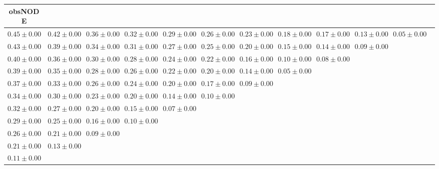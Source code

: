 \begin{table}[ht]
\centering
{\tiny
{
\begin{adjustbox}{width=\textwidth}
\begin{tabular}{cccccccccccc}
\hline
obsNODE &  &  &  &  &  &  &  &  &  & \\
\hline
$0.45 \pm 0.00$ & $0.42 \pm 0.00$ & $0.36 \pm 0.00$ & $0.32 \pm 0.00$ & $0.29 \pm 0.00$ & $0.26 \pm 0.00$ & $0.23 \pm 0.00$ & $0.18 \pm 0.00$ & $0.17 \pm 0.00$ & $0.13 \pm 0.00$ & $0.05 \pm 0.00$ &  \\
$0.43 \pm 0.00$ & $0.39 \pm 0.00$ & $0.34 \pm 0.00$ & $0.31 \pm 0.00$ & $0.27 \pm 0.00$ & $0.25 \pm 0.00$ & $0.20 \pm 0.00$ & $0.15 \pm 0.00$ & $0.14 \pm 0.00$ & $0.09 \pm 0.00$ &  &  \\
$0.40 \pm 0.00$ & $0.36 \pm 0.00$ & $0.30 \pm 0.00$ & $0.28 \pm 0.00$ & $0.24 \pm 0.00$ & $0.22 \pm 0.00$ & $0.16 \pm 0.00$ & $0.10 \pm 0.00$ & $0.08 \pm 0.00$ &  &  &  \\
$0.39 \pm 0.00$ & $0.35 \pm 0.00$ & $0.28 \pm 0.00$ & $0.26 \pm 0.00$ & $0.22 \pm 0.00$ & $0.20 \pm 0.00$ & $0.14 \pm 0.00$ & $0.05 \pm 0.00$ &  &  &  &  \\
$0.37 \pm 0.00$ & $0.33 \pm 0.00$ & $0.26 \pm 0.00$ & $0.24 \pm 0.00$ & $0.20 \pm 0.00$ & $0.17 \pm 0.00$ & $0.09 \pm 0.00$ &  &  &  &  &  \\
$0.34 \pm 0.00$ & $0.30 \pm 0.00$ & $0.23 \pm 0.00$ & $0.20 \pm 0.00$ & $0.14 \pm 0.00$ & $0.10 \pm 0.00$ &  &  &  &  &  &  \\
$0.32 \pm 0.00$ & $0.27 \pm 0.00$ & $0.20 \pm 0.00$ & $0.15 \pm 0.00$ & $0.07 \pm 0.00$ &  &  &  &  &  &  &  \\
$0.29 \pm 0.00$ & $0.25 \pm 0.00$ & $0.16 \pm 0.00$ & $0.10 \pm 0.00$ &  &  &  &  &  &  &  &  \\
$0.26 \pm 0.00$ & $0.21 \pm 0.00$ & $0.09 \pm 0.00$ &  &  &  &  &  &  &  &  &  \\
$0.21 \pm 0.00$ & $0.13 \pm 0.00$ &  &  &  &  &  &  &  &  &  &  \\
$0.11 \pm 0.00$ &  &  &  &  &  &  &  &  &  &  &  \\



\end{tabular}
\end{adjustbox}}}
\end{table}
